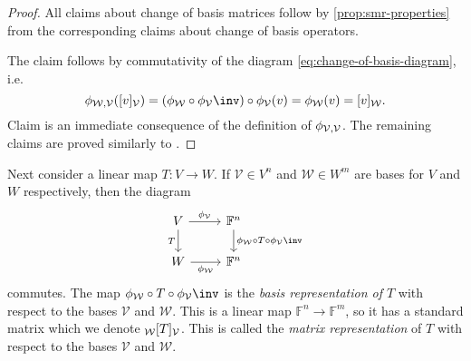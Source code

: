 \documentclass[article, a4paper, 11pt, oneside]{memoir}
\numberwithin{equation}{chapter}
\newcommand{\calV}{\mathcal{V}}
\newcommand{\calW}{\mathcal{W}}
\newcommand{\field}{\mathbb{F}}
\begin{document}
\begin{proof}
    All claims about change of basis matrices follow by \cref{prop:smr-properties} from the corresponding claims about change of basis operators.

    The claim  follows by commutativity of the diagram \cref{eq:change-of-basis-diagram}, i.e.
    \begin{equation*}
        \basischange{\calW}{\calV} (\coordvec{v}{\calV})
            = (\coordmap{\calW} \circ \coordmap{\calV}\inv) \circ \coordmap{\calV}(v)
            = \coordmap{\calW}(v)
            = \coordvec{v}{\calW}.
    \end{equation*}
    Claim  is an immediate consequence of the definition of $\basischange{\calV}{\calV}$. The remaining claims are proved similarly to .
\end{proof}

Next consider a linear map $T \colon V \to W$. If $\calV \in V^n$ and $\calW \in W^m$ are bases for $V$ and $W$ respectively, then the diagram
%
\begin{equation*}
    \begin{tikzcd}
        V
            \ar[d, "T", swap]
            \ar[r, "\coordmap{\calV}"]
        & \field^n
            \ar[d, "\coordmap{\calW} \circ T \circ \coordmap{\calV}\inv"] \\
        W
            \ar[r, "\coordmap{\calW}", swap]
        & \field^n
    \end{tikzcd}
\end{equation*}
%
commutes. The map $\coordmap{\calW} \circ T \circ \coordmap{\calV}\inv$ is the \emph{basis representation of $T$} with respect to the bases $\calV$ and $\calW$. This is a linear map $\field^n \to \field^m$, so it has a standard matrix which we denote $\mr{\calW}{T}{\calV}$. This is called the \emph{matrix representation} of $T$ with respect to the bases $\calV$ and $\calW$.
\end{document}
